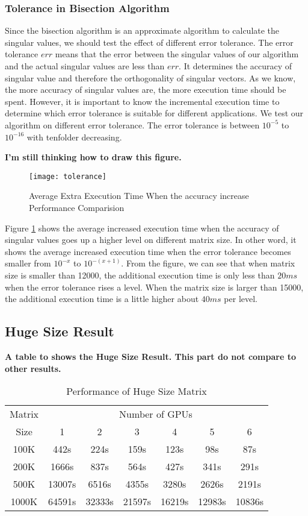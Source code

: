 \subsubsection{Tolerance in Bisection Algorithm}
Since the bisection algorithm is an approximate algorithm to calculate the singular values, we should test the effect of different error tolerance.
The error tolerance $err$ means that the error between the singular values of our algorithm and the actual singular values are less than $err$.
It determines the accuracy of singular value and therefore the orthogonality of singular vectors.
As we know, the more accuracy of singular values are, the more execution time should be spent.
However, it is important to know the incremental execution time to determine which error tolerance is suitable for different applications.
We test our algorithm on different error tolerance.
The error tolerance is between $10^{-5}$ to $10^{-16}$ with tenfolder decreasing.

\textbf{I'm still thinking how to draw this figure.}
\begin{figure}[hbpt]
\centering
\texttt{[image: tolerance]}
\caption{Average Extra Execution Time When the accuracy increase Performance Comparision}
\label{fig:tolerance}
\end{figure}
Figure \ref{fig:tolerance} shows the average increased execution time when the accuracy of singular values goes up a higher level on different matrix size.
In other word, it shows the average increased execution time when the error tolerance becomes smaller from $10^{-x}$ to $10^{-(x+1)}$.
From the figure, we can see that when matrix size is smaller than 12000, the additional execution time is only less than $20 ms$ when the error tolerance rises a level.
When the matrix size is larger than 15000, the additional execution time is a little higher about $40 ms$ per level.


\subsection{Huge Size Result}
\textbf{A table to shows the Huge Size Result. This part do not compare to other results.} 

\begin{table}[h]
\caption{Performance of Huge Size Matrix}
\centering
\begin{tabular}{|c|c|c|c|c|c|c|}
\hline
Matrix & \multicolumn{6}{|c|}{Number of GPUs} \\ \cline{2-7}
Size & 1 & 2 & 3 & 4 & 5 & 6 \\ \hline
100K   &   442s  &   224s  &   159s  &   123s  &    98s  &    87s\\ \hline
200K   &  1666s  &   837s  &   564s  &   427s  &   341s  &   291s\\ \hline
500K   & 13007s  &  6516s  &  4355s  &  3280s  &  2626s  &  2191s\\ \hline
1000K  & 64591s  & 32333s  & 21597s  & 16219s  & 12983s  & 10836s\\ \hline
\end{tabular}
\label{tab:hresult}
\end{table}

